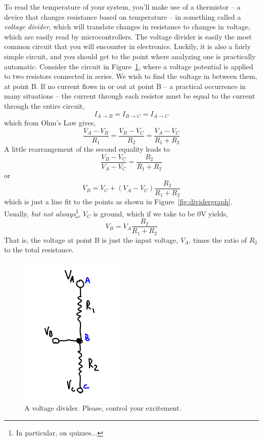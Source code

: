 \documentclass[11pt]{article} %
\begin{document}
To read the temperature of your system, you’ll make use of a thermistor -- a device that changes resistance based on temperature -- in something called a \emph{voltage divider}, which will translate changes in resistance to changes in voltage, which are easily read by microcontrollers. The voltage divider is easily the most common circuit that you will encounter in electronics. Luckily, it is also a fairly simple circuit, and you should get to the point where analyzing one is practically automatic. Consider the circuit in Figure~\ref{fig:voltage.divider}, where a voltage potential is applied to two resistors connected in series. We wish to find the voltage in between them, at point B. If no current flows in or out at point B -- a practical occurrence in many situations -- the current through each resistor must be equal to the current through the entire circuit,
\[
I_{A\rightarrow B} = I_{B\rightarrow C} = I_{A\rightarrow C}
\]
which from Ohm’s Law gives,
\[
\frac {V_A - V_B} {R_1} = \frac {V_B - V_C} {R_2} = \frac {V_A - V_C} {R_1 + R_2}
\]
A little rearrangement of the second equality leads to
\[
\frac {V_B - V_C} {V_A- V_C} = \frac {R_2} {R_1 + R_2}
\]
or
\[
V_B= V_C+\left(V_A- V_C\right) \frac {R_2} {R_1 + R_2}
\]
which is just a line fit to the points as shown in Figure~\ref{fig:dividergraph}. Usually, \emph{but not always}\footnote{In particular, on quizzes...}, $V_C$ is ground, which if we take to be 0V yields,
\[
V_B =V_A  \frac {R_2} {R_1 + R_2}
\]
That is, the voltage at point B is just the input voltage, $V_A$, times the ratio of $R_2$ to the total resistance.
\begin{figure}
\centering
\includegraphics[width=2in]{figures/voltagedivider.png}
\caption{A voltage divider. Please, control your excitement.}
\label{fig:voltage.divider}
\end{figure}
\end{document}
